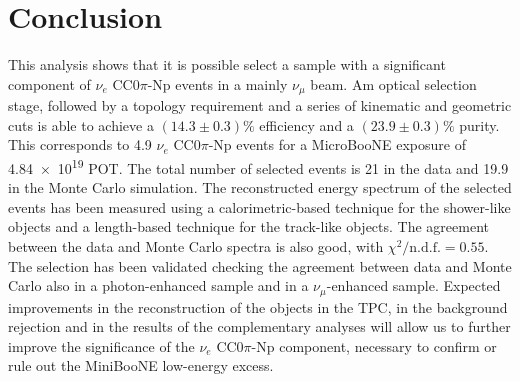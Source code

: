 
\section{Conclusion}
This analysis shows that it is possible select a sample with a significant component of $\nu_{e}$ CC0$\pi$-Np events in a mainly $\nu_\mu$ beam. Am optical selection stage, followed by a topology requirement and a series of kinematic and geometric cuts is able to achieve a $(14.3\pm0.3)\%$ efficiency and a $(23.9\pm0.3)\%$ purity. This corresponds to 4.9 $\nu_{e}$ CC0$\pi$-Np events for a MicroBooNE exposure of \num{4.84e19} POT. The total number of selected events is 21 in the data and 19.9 in the Monte Carlo simulation. 
The reconstructed energy spectrum of the selected events has been measured using a calorimetric-based technique for the shower-like objects and a length-based technique for the track-like objects. The agreement between the data and Monte Carlo spectra is also good, with $\chi^{2} / \mathrm{n.d.f.} = 0.55$.
The selection has been validated checking the agreement between data and Monte Carlo also in a photon-enhanced sample and in a $\nu_\mu$-enhanced sample.
Expected improvements in the reconstruction of the objects in the TPC, in the background rejection and in the results of the complementary analyses will allow us to further improve the significance of the $\nu_{e}$ CC0$\pi$-Np component, necessary to confirm or rule out the MiniBooNE low-energy excess.